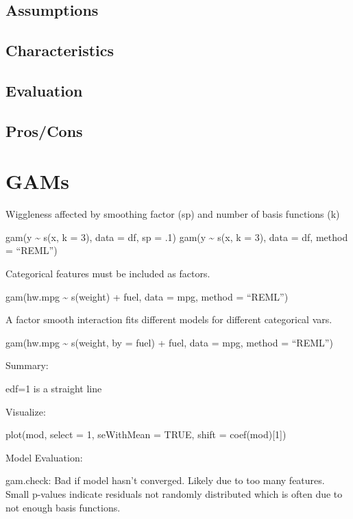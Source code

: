 \documentclass[]{book}
\begin{document}
\hypertarget{assumptions-12}{%
\subsection{Assumptions}\label{assumptions-12}}

\hypertarget{characteristics-11}{%
\subsection{Characteristics}\label{characteristics-11}}

\hypertarget{evaluation-12}{%
\subsection{Evaluation}\label{evaluation-12}}

\hypertarget{proscons-12}{%
\subsection{Pros/Cons}\label{proscons-12}}

\hypertarget{gams}{%
\section{GAMs}\label{gams}}

Wiggleness affected by smoothing factor (sp) and number of basis functions (k)

gam(y \textasciitilde{} s(x, k = 3), data = df, sp = .1)
gam(y \textasciitilde{} s(x, k = 3), data = df, method = ``REML'')

Categorical features must be included as factors.

gam(hw.mpg \textasciitilde{} s(weight) + fuel, data = mpg, method = ``REML'')

A factor smooth interaction fits different models for different categorical vars.

gam(hw.mpg \textasciitilde{} s(weight, by = fuel) + fuel, data = mpg, method = ``REML'')

Summary:

edf=1 is a straight line

Visualize:

plot(mod, select = 1, seWithMean = TRUE, shift = coef(mod){[}1{]})

Model Evaluation:

gam.check: Bad if model hasn't converged. Likely due to too many features. Small p-values indicate residuals not randomly distributed which is often due to not enough basis functions.
\end{document}
